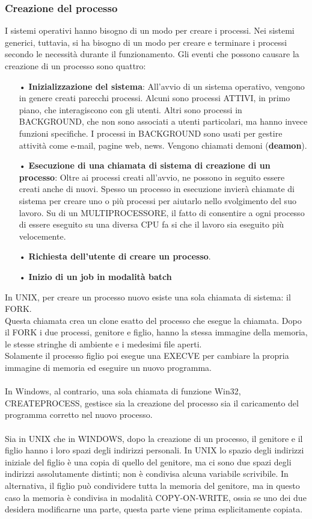 \documentclass{article}
\begin{document}
\subsubsection{Creazione del processo}
I sistemi operativi hanno bisogno di un modo per creare i processi. Nei sistemi generici, tuttavia, si ha bisogno di un modo per creare e terminare i processi secondo le necessità durante il funzionamento. Gli eventi che possono causare la creazione di un processo sono quattro:
\begin{enumerate}
   \item[•] \textbf{Inizializzazione del sistema}: All’avvio di un sistema operativo, vengono in genere creati parecchi processi. Alcuni sono processi ATTIVI, in primo piano, che interagiscono con gli utenti. Altri sono processi in BACKGROUND, che non sono associati a utenti particolari, ma hanno invece funzioni specifiche. I processi in BACKGROUND sono usati per gestire attività come e-mail, pagine web, news. Vengono chiamati demoni (\textbf{deamon}).
   \item[•] \textbf{Esecuzione di una chiamata di sistema di creazione di un processo}: Oltre ai processi creati all’avvio, ne possono in seguito essere creati anche di nuovi. 
Spesso un processo in esecuzione invierà chiamate di sistema per creare uno o più processi per aiutarlo nello svolgimento del suo lavoro.
Su di un MULTIPROCESSORE, il fatto di consentire a ogni processo di essere eseguito su una diversa CPU fa si che il lavoro sia eseguito più velocemente. 
   \item[•] \textbf{Richiesta dell'utente di creare un processo}.
   \item[•] \textbf{Inizio di un job in modalità batch}
\end{enumerate}
In UNIX, per creare un processo nuovo esiste una sola chiamata di sistema: il FORK.
\\Questa chiamata crea un clone esatto del processo che esegue la chiamata. Dopo il FORK i due processi, genitore e figlio, hanno la stessa immagine della memoria, le stesse stringhe di ambiente e i medesimi file aperti.
\\Solamente il processo figlio poi esegue una EXECVE per cambiare la propria immagine di memoria ed eseguire un nuovo programma.
\\
\\In Windows, al contrario, una sola chiamata di funzione Win32, CREATEPROCESS, gestisce sia la creazione del processo sia il caricamento del programma corretto nel nuovo processo. 
\\
\\
Sia in UNIX che in WINDOWS, dopo la creazione di un processo, il genitore e il figlio hanno i loro spazi degli indirizzi personali. In UNIX lo spazio degli indirizzi iniziale del figlio è una copia di quello del genitore, ma ci sono due spazi degli indirizzi assolutamente distinti; non è condivisa alcuna variabile scrivibile. In alternativa, il figlio può condividere tutta la memoria del genitore, ma in questo caso la memoria è condivisa in modalità COPY-ON-WRITE, ossia se uno dei due desidera modificarne una parte, questa parte viene prima esplicitamente copiata.
\end{document}
